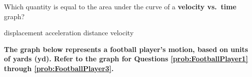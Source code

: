 \documentclass[../main-physics-problems.tex]{subfiles}
\begin{document}
\begin{questions}
















% 

\question
Which quantity is equal to the area under the curve of a \textbf{velocity vs.~time} graph?
\begin{choices}
\correctchoice displacement
\choice acceleration
\choice distance
\choice velocity
\end{choices}





\begin{EnvUplevel}
\textbf{The graph below represents a football player's motion, based on units of yards (yd). Refer to the graph for Questions \ref{prob:FootballPlayer1} through \ref{prob:FootballPlayer3}.}
\end{EnvUplevel}

\begin{figure}[h!]
    \centering
    \label{fig:my_label}
\end{figure}


\end{questions}
\end{document}
